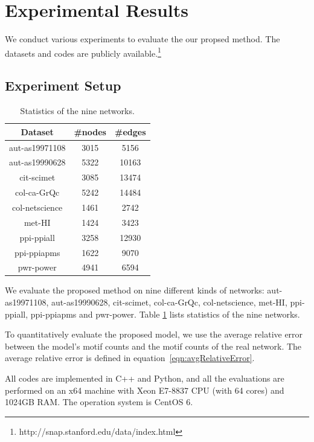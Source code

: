 \section{Experimental Results}
\label{sec:exp}

We conduct various experiments to evaluate the our propsed method.
The datasets and codes are publicly available.\footnote{http://snap.stanford.edu/data/index.html}

\subsection{Experiment Setup}

\begin{table}[t]
\centering
\begin{tabular}{|c|c@{ }|c@{ }|}
\hline
Dataset             &   \#nodes       &   \#edges \\ \hline
aut-as19971108 & 3015 & 5156 \\\hline
aut-as19990628 & 5322 & 10163 \\\hline
cit-scimet & 3085 & 13474 \\\hline
col-ca-GrQc & 5242 & 14484 \\\hline
col-netscience & 1461 & 2742 \\\hline
met-HI & 1424 & 3423 \\\hline
ppi-ppiall & 3258 & 12930 \\\hline
ppi-ppiapms & 1622 & 9070 \\\hline
pwr-power & 4941 & 6594 \\\hline
\end{tabular}
\caption{Statistics of the nine networks.}
\label{tb:statistics}
\end{table}


 We evaluate the proposed method on nine different kinds of networks: aut-as19971108, aut-as19990628, cit-scimet, col-ca-GrQc, col-netscience, met-HI, ppi-ppiall, ppi-ppiapms and pwr-power.
Table \ref{tb:statistics} lists statistics of the nine networks. 

 To quantitatively evaluate the proposed model, we use the average relative error between the model's motif counts and the motif counts of the real network.  The average relative error is defined in equation~\ref{eqn:avgRelativeError}.

All codes are implemented in C++ and Python, and all the evaluations are performed on an x64 machine with Xeon E7-8837 CPU (with 64 cores) and 1024GB RAM. The operation system is CentOS 6. 

